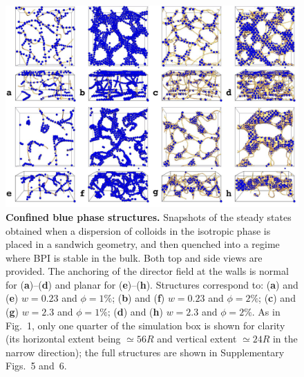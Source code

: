 \documentclass[12pt]{article}
\begin{document}
\begin{figure}
\centerline{\includegraphics[width=\textwidth]{text-fig2.jpg}}
\caption{\textbf{Confined blue phase structures.}
Snapshots of the steady states obtained when a dispersion of colloids in
the isotropic phase is placed in a sandwich geometry, 
and then quenched into a regime where BPI is stable in the bulk.
Both top and side views are provided.
The anchoring of the director field at the walls is normal for
(\textbf{a})--(\textbf{d}) and planar for (\textbf{e})--(\textbf{h}). 
Structures correspond to:
(\textbf{a}) and (\textbf{e}) $w=0.23$ and $\phi=1\%$; 
(\textbf{b}) and (\textbf{f}) $w=0.23$ and $\phi=2\%$; 
(\textbf{c}) and (\textbf{g}) $w=2.3$ and $\phi=1\%$;
(\textbf{d}) and (\textbf{h}) $w=2.3$ and $\phi=2\%$.
As in Fig.~1, only one quarter of the simulation box is shown for clarity
(its horizontal extent being $\simeq 56R$ and vertical
extent $\simeq 24R$ in the narrow direction);
the full structures are shown in Supplementary Figs.~5 and~6.}
\end{figure}
\end{document}

